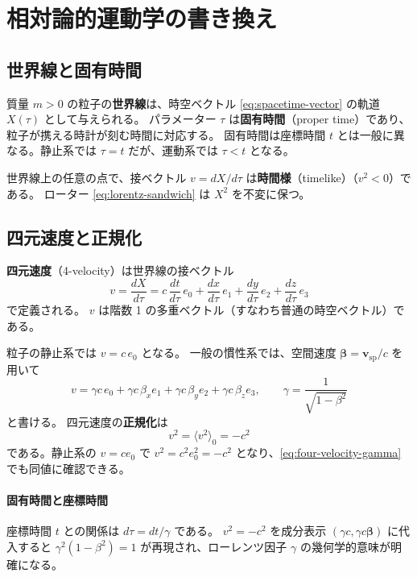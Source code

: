 \documentclass[dvipdfmx,a4paper,oneside]{jsbook}
\numberwithin{equation}{chapter}
\begin{document}
\section{相対論的運動学の書き換え}

\subsection{世界線と固有時間}

質量 \(m>0\) の粒子の\textbf{世界線}は、時空ベクトル \eqref{eq:spacetime-vector} の軌道 \(X(\tau)\) として与えられる。
パラメーター \(\tau\) は\textbf{固有時間}（proper time）であり、粒子が携える時計が刻む時間に対応する。
固有時間は座標時間 \(t\) とは一般に異なる。静止系では \(\tau = t\) だが、運動系では \(\tau < t\) となる。

世界線上の任意の点で、接ベクトル \(v = dX/d\tau\) は\textbf{時間様}（timelike）（\(v^2 < 0\)）である。
ローター \eqref{eq:lorentz-sandwich} は \(X^2\) を不変に保つ。

\subsection{四元速度と正規化}

\textbf{四元速度}（4-velocity）は世界線の接ベクトル
\begin{equation}
  v = \frac{dX}{d\tau} = c\,\frac{dt}{d\tau}\,e_0 + \frac{dx}{d\tau}\,e_1 + \frac{dy}{d\tau}\,e_2 + \frac{dz}{d\tau}\,e_3
  \label{eq:four-velocity}
\end{equation}
で定義される。
\(v\) は階数 1 の多重ベクトル（すなわち普通の時空ベクトル）である。

粒子の静止系では \(v = c\,e_0\) となる。
一般の慣性系では、空間速度 \(\boldsymbol{\beta} = \mathbf{v}_{\mathrm{sp}}/c\) を用いて
\begin{equation}
  v = \gamma c\, e_0 + \gamma c\,\beta_x e_1 + \gamma c\,\beta_y e_2 + \gamma c\,\beta_z e_3,
  \qquad \gamma = \frac{1}{\sqrt{1-\beta^2}}
  \label{eq:four-velocity-gamma}
\end{equation}
と書ける。
四元速度の\textbf{正規化}は
\begin{equation}
  v^2 = \langle v^2 \rangle_0 = -c^2
  \label{eq:four-velocity-norm}
\end{equation}
である。静止系の \(v=c e_0\) で \(v^2 = c^2 e_0^2 = -c^2\) となり、\eqref{eq:four-velocity-gamma} でも同値に確認できる。

\paragraph{固有時間と座標時間}
座標時間 \(t\) との関係は \(d\tau = dt/\gamma\) である。
\(v^2=-c^2\) を成分表示 \((\gamma c, \gamma c\boldsymbol{\beta})\) に代入すると \(\gamma^2(1-\beta^2)=1\) が再現され、ローレンツ因子 \(\gamma\) の幾何学的意味が明確になる。
\end{document}
